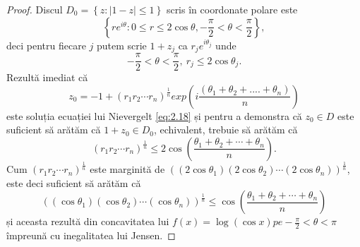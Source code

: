 \documentclass[a4paper,12pt,oneside]{report}
\begin{document}
\begin{proof}
Discul \(D_{0} = \left \{ z : \left | 1 - z \right |\leq 1 \right \}\) scris în coordonate polare este
\begin{displaymath}
    \left \{ re^{i\theta }: 0 \leq r\leq 2\cos\theta , -\frac{\pi }{2}< \theta  < \frac{\pi }{2} \right \},
\end{displaymath}
deci pentru fiecare \(j\) putem scrie \(1 + z_{j}\) ca \(r_{j}e^{i\theta _{j}}\) unde \[-\frac{\pi }{2}< \theta  < \frac{\pi }{2},~r_{j}\leq 2\cos\theta _{j}.\]
 Rezultă imediat că \[z_{0} = -1 + \left ( r_{1} r_{2}\cdots r_{n}\right )^{\frac{1}{n}}exp\left ( i\frac{\left ( \theta _{1} + \theta _{2} +....+ \theta _{n} \right )}{n} \right )\] este soluția ecuației lui Nievergelt \ref{eq:2.18} și pentru a demonstra că \(z_{0}\in D \) este suficient să arătăm că \(1 + z_{0}\in D_{0}\), echivalent, trebuie să arătăm că
\begin{displaymath}
    \left ( r_{1} r_{2} \cdots r_{n}\right )^{\frac{1}{n}}\leq 2\cos\left ( \frac{\theta _{1} + \theta _{2}+\cdots+\theta _{n}}{n} \right ) \label{eq:2.19} \tag{2.19}.
\end{displaymath}
Cum \(\left ( r_{1} r_{2} \cdots r_{n}\right )^{\frac{1}{n}}\) este marginită de \(\left ( \left (2\cos\theta _{1}  \right )\left ( 2\cos\theta _{2} \right )\cdots \left (2\cos\theta _{n}  \right ) \right )^{\frac{1}{n}}\), este deci suficient să arătăm că
\begin{displaymath}
    \left ( \left (\cos\theta _{1}  \right )\left ( \cos\theta _{2} \right )\cdots \left (\cos\theta _{n}  \right ) \right )^{\frac{1}{n}}\leq \cos\left ( \frac{\theta _{1} + \theta _{2}+\cdots+\theta _{n}}{n} \right )
\end{displaymath}
și aceasta rezultă din concavitatea lui \(f\left ( x \right ) = \log \left ( \cos x \right ) pe -\frac{\pi }{2}< \theta < \pi\) împreună cu inegalitatea lui Jensen.
\end{proof}
\end{document}
